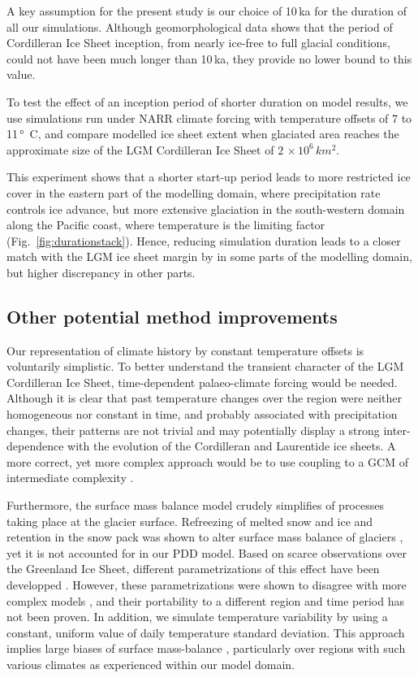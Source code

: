 A key assumption for the present study is our choice of 10\,ka for the duration of all our simulations. Although geomorphological data shows that the period of Cordilleran Ice Sheet inception, from nearly ice-free to full glacial conditions, could not have been much longer than 10\,ka, they provide no lower bound to this value.

To test the effect of an inception period of shorter duration on model results, we use simulations run under NARR climate forcing with temperature offsets of 7 to 11\,\unit{\degree C}, and compare modelled ice sheet extent when glaciated area reaches the approximate size of the LGM Cordilleran Ice Sheet of $2\,\times10^6\,\unit{km^2}$.

This experiment shows that a shorter start-up period leads to more restricted ice cover in the eastern part of the modelling domain, where precipitation rate controls ice advance, but more extensive glaciation in the south-western domain along the Pacific coast, where temperature is the limiting factor (Fig.~\ref{fig:durationstack}). Hence, reducing simulation duration leads to a closer match with the LGM ice sheet margin by \citet{dyke-2004} in some parts of the modelling domain, but higher discrepancy in other parts.

\subsection{Other potential method improvements}

Our representation of climate history by constant temperature offsets is voluntarily simplistic. To better understand the transient character of the LGM Cordilleran Ice Sheet, time-dependent palaeo-climate forcing would be needed. Although it is clear that past temperature changes over the region were neither homogeneous nor constant in time, and probably associated with precipitation changes, their patterns are not trivial and may potentially display a strong inter-dependence with the evolution of the Cordilleran and Laurentide ice sheets. A more correct, yet more complex approach would be to use coupling to a GCM of intermediate complexity \citep{yoshimori-etal-2001,calov-etal-2002,abeouchi-etal-2007,charbit-etal-2013}.

Furthermore, the surface mass balance model crudely simplifies of processes taking place at the glacier surface. Refreezing of melted snow and ice and retention in the snow pack was shown to alter surface mass balance of glaciers \citep{trabant-mayo-1985}, yet it is not accounted for in our PDD model. Based on scarce observations over the Greenland Ice Sheet, different parametrizations of this effect have been developped \citep{janssens-huybrechts-2000,fausto-etal-2009b}. However, these parametrizations were shown to disagree with more complex models \citep{reijmer-etal-2012}, and their portability to a different region and time period has not been proven. In addition, we simulate temperature variability by using a constant, uniform value of daily temperature standard deviation. This approach implies large biases of surface mass-balance \citep{charbit-etal-2013,rau-rogozhina-2013,seguinot-2013}, particularly over regions with such various climates as experienced within our model domain.
